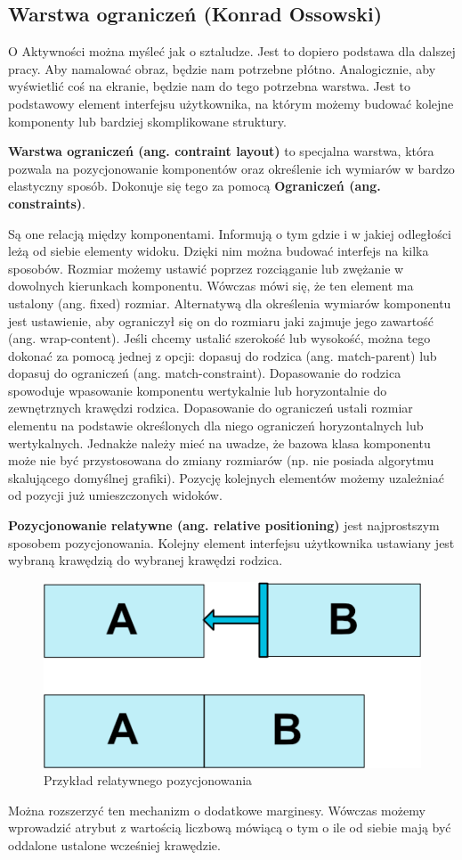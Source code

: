 \subsection{Warstwa ograniczeń (Konrad Ossowski)}
O Aktywności można myśleć jak o sztaludze. Jest to dopiero podstawa dla dalszej pracy. Aby namalować obraz, będzie nam potrzebne płótno. Analogicznie, aby wyświetlić coś na ekranie, będzie nam do tego potrzebna warstwa. Jest to podstawowy element interfejsu użytkownika, na którym możemy budować kolejne komponenty lub bardziej skomplikowane struktury.\par\textbf{Warstwa ograniczeń (ang. contraint layout)} to specjalna warstwa, która pozwala na pozycjonowanie komponentów oraz określenie ich wymiarów w bardzo elastyczny sposób. Dokonuje się tego za pomocą \textbf{Ograniczeń (ang. constraints)}.\par Są one relacją między komponentami. Informują o tym gdzie i w jakiej odległości leżą od siebie elementy widoku. Dzięki nim można budować interfejs na kilka sposobów. Rozmiar możemy ustawić poprzez rozciąganie lub zwężanie w dowolnych kierunkach komponentu. Wówczas mówi się, że ten element ma ustalony (ang. fixed) rozmiar. Alternatywą dla określenia wymiarów komponentu jest ustawienie, aby ograniczył się on do rozmiaru jaki zajmuje jego zawartość (ang. wrap-content). Jeśli chcemy ustalić szerokość lub wysokość, można tego dokonać za pomocą jednej z opcji: dopasuj do rodzica (ang. match-parent) lub dopasuj do ograniczeń (ang. match-constraint). Dopasowanie do rodzica spowoduje wpasowanie komponentu wertykalnie lub horyzontalnie do zewnętrznych krawędzi rodzica. Dopasowanie do ograniczeń ustali rozmiar elementu na podstawie określonych dla niego ograniczeń horyzontalnych lub wertykalnych. Jednakże należy mieć na uwadze, że bazowa klasa komponentu może nie być przystosowana do zmiany rozmiarów (np. nie posiada algorytmu skalującego domyślnej grafiki). Pozycję kolejnych elementów możemy uzależniać od pozycji już umieszczonych widoków.\par \textbf{Pozycjonowanie relatywne (ang. relative positioning)} jest najprostszym sposobem pozycjonowania. Kolejny element interfejsu użytkownika ustawiany jest wybraną krawędzią do wybranej krawędzi rodzica. 
\begin{figure}[H]
\centering
\includegraphics[scale=0.7]{imgs/relative-positioning.png}
\caption{Przykład relatywnego pozycjonowania\cite{constraintlayout}}
\end{figure} Można rozszerzyć ten mechanizm o dodatkowe marginesy. Wówczas możemy wprowadzić atrybut z wartością liczbową mówiącą o tym o ile od siebie mają być oddalone ustalone wcześniej krawędzie. \cite{constraintlayout}
